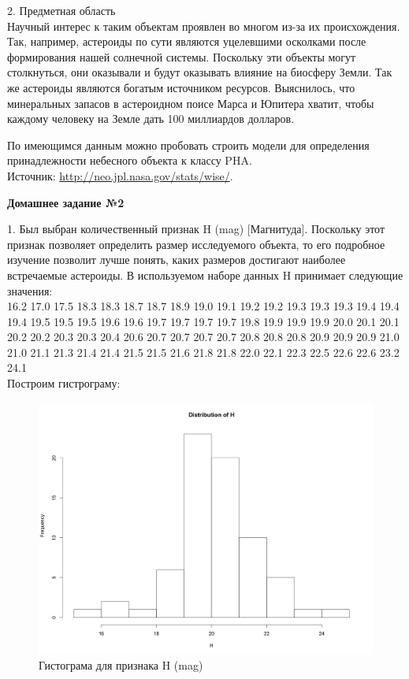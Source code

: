 \documentclass{article}
\begin{document}
2. Предметная область\\[0.15cm]

Научный интерес к таким объектам проявлен во многом из-за их происхождения. Так, например, астероиды по сути являются уцелевшими осколками после формирования нашей солнечной системы. Поскольку эти объекты могут столкнуться, они оказывали и будут оказывать влияние на биосферу Земли. Так же астероиды являются богатым источником ресурсов. Выяснилось, что минеральных запасов в астероидном поисе Марса и Юпитера хватит, чтобы каждому человеку на Земле дать 100 миллиардов долларов.

По имеющимся данным можно пробовать строить модели для определения принадлежности небесного объекта к классу PHA. \\[1cm]

Источник: \href{http://neo.jpl.nasa.gov/stats/wise/}{http://neo.jpl.nasa.gov/stats/wise/}. 

\vspace{.2cm}
\large \textbf{Домашнее задание №2}
\vspace{.2cm}

1. Был выбран количественный признак H (mag) [Магнитуда]. Поскольку этот признак позволяет определить размер исследуемого объекта, то его подробное изучение позволит лучше понять, каких размеров достигают наиболее встречаемые астероиды. В используемом наборе данных H принимает следующие значения: \\[0.15cm]
  16.2 17.0 17.5 18.3 18.3 18.7 18.7 18.9 19.0 19.1 19.2 19.2 19.3 19.3 19.3 19.4 19.4 19.4 19.5 19.5 19.5
 19.6 19.6 19.7 19.7 19.7 19.7 19.8 19.9 19.9 19.9 20.0 20.1 20.1 20.2 20.2 20.3 20.3 20.4 20.6 20.7 20.7 20.7
 20.7 20.8 20.8 20.8 20.9 20.9 20.9 21.0 21.0 21.1 21.3 21.4 21.4 21.5 21.5 21.6 21.8 21.8 22.0 22.1 22.3 22.5
 22.6 22.6 23.2 24.1 \\[0.15cm]
Построим гистрограму: 

\begin{figure}[H] 
\centering
\includegraphics[scale=0.4]{img/2_hist.png}
\caption{Гистограма для признака H (mag)}
\label{fig :metka1}
\end{figure}
\end{document}
